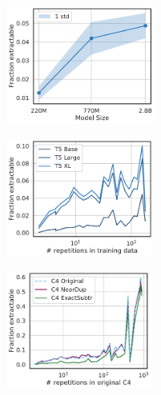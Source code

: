 \begin{figure}[t]

    \centering
    \begin{subfigure}[b]{0.32\textwidth}
        \includegraphics[height=10.5em]{figures/t5_size_vs_extractable_all}
        \caption{}
        \label{fig:other-models-size}
    \end{subfigure}
    \hfill
    \begin{subfigure}[b]{0.32\textwidth}
        \includegraphics[height=10.5em]{figures/t5_exactly_mem-vs-repetitions-mean-xlabel-ylabel}
        \caption{}
        \label{fig:other-models-dups}
    \end{subfigure}
    \hfill
    \begin{subfigure}[b]{0.32\textwidth}
        \includegraphics[height=10.5em]{figures/t5dedup_exactly_mem-vs-repetitions-mean}        \caption{}
        \label{fig:other-models-dedup}
    \end{subfigure}


\end{figure}

